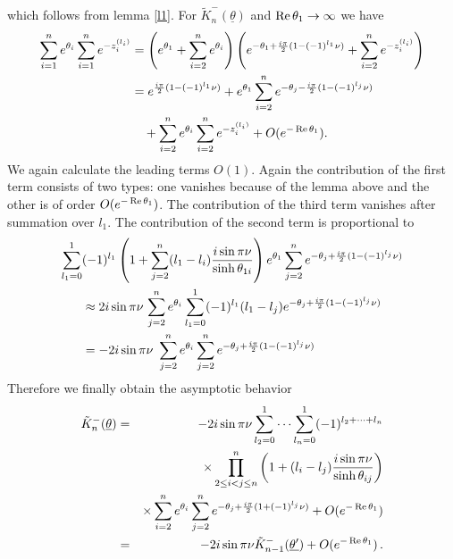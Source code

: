 \documentclass[a4paper,a4paper]{article}
\begin{document}
which follows from lemma \ref{l1}. For $\tilde{K}_{n}^{-}(\underline{\theta }%
)$ and $\mathop{\rm Re}\theta _{1}\rightarrow \infty $ we have 
\begin{align*}
\sum_{i=1}^{n}e^{\theta _{i}}\sum_{i=1}^{n}e^{-z_{i}^{(l_{i})}}& =\left(
e^{\theta _{1}}+\sum_{i=2}^{n}e^{\theta _{i}}\right) \left( e^{-\theta _{1}+%
\frac{i\pi }{2}(1-(-1)^{l_{1}}\nu
)}+\sum_{i=2}^{n}e^{-z_{i}^{(l_{i})}}\right) \\
& =e^{\frac{i\pi }{2}(1-(-1)^{l_{1}}\nu )}+e^{\theta
_{1}}\sum_{i=2}^{n}e^{-\theta _{j}-\frac{i\pi }{2}(1-(-1)^{l_{j}}\nu )} \\
& ~~~+\sum_{i=2}^{n}e^{\theta _{i}}\sum_{i=2}^{n}e^{-z_{i}^{(l_{i})}}+O(e^{-%
\mathop{\rm Re}\theta _{1}}).
\end{align*}
We again calculate the leading terms $O(1).$ Again the contribution of the
first term consists of two types: one vanishes because of the lemma above
and the other is of order $O(e^{-\mathop{\rm Re}\theta _{1}})$. The
contribution of the third term vanishes after summation over $l_{1}.$ The
contribution of the second term is proportional to 
\begin{align*}
\sum_{l_{1}=0}^{1}& (-1)^{l_{1}}\left( 1+\sum_{j=2}^{n}(l_{1}-l_{i})\frac{%
i\sin \pi \nu }{\sinh \theta _{1i}}\right) e^{\theta
_{1}}\sum_{j=2}^{n}e^{-\theta _{j}+\frac{i\pi }{2}(1-(-1)^{l_{j}}\nu )} \\
& \approx 2i\sin \pi \nu \,\sum_{j=2}^{n}e^{\theta
_{i}}\sum_{l_{1}=0}^{1}(-1)^{l_{1}}(l_{1}-l_{j})e^{-\theta _{j}+\frac{i\pi }{%
2}(1-(-1)^{l_{j}}\nu )} \\
& =-2i\sin \pi \nu \,\,\sum_{j=2}^{n}e^{\theta _{i}}\sum_{j=2}^{n}e^{-\theta
_{j}+\frac{i\pi }{2}(1-(-1)^{l_{j}}\nu )}
\end{align*}
Therefore we finally obtain the asymptotic behavior 
\begin{eqnarray*}
\tilde{K}_{n}^{-}(\underline{\theta }) &=&-2i\sin \pi \nu
\sum_{l_{2}=0}^{1}\dots \sum_{l_{n}=0}^{1}(-1)^{l_{2}+\dots +l_{n}} \\
&&\times \prod_{2\leq i<j\leq n}^{n}\left( 1+(l_{i}-l_{j})\frac{i\sin \pi
\nu }{\sinh \theta _{ij}}\right) \\
&&\times \sum_{i=2}^{n}e^{\theta _{i}}\sum_{j=2}^{n}e^{-\theta _{j}+\frac{%
i\pi }{2}(1+(-1)^{l_{j}}\nu )}+O(e^{-\mathop{\rm Re}\theta _{1}}) \\
&=&-2i\sin \pi \nu \tilde{K}_{n-1}^{-}(\underline{\theta ^{\prime }})+O(e^{-%
\mathop{\rm Re}\theta _{1}})\,.
\end{eqnarray*}
\end{document}
